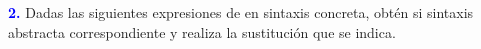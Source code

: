 \vspace*{0.5cm}
\textbf{\textcolor{blue}{2.}} Dadas las siguientes expresiones de 
en sintaxis concreta, obtén si sintaxis abstracta correspondiente y realiza
la sustitución que se indica.
